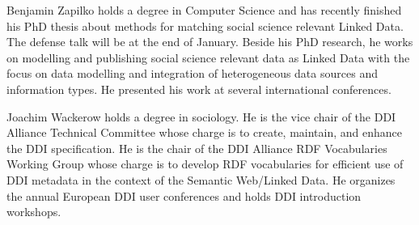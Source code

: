 \documentclass{llncs}
\begin{document}
Benjamin Zapilko holds a degree in Computer Science and has recently finished his PhD thesis about methods for matching social science relevant Linked Data. The defense talk will be at the end of January. Beside his PhD research, he works on modelling and publishing social science relevant data as Linked Data with the focus on data modelling and integration of heterogeneous data sources and information types. He presented his work at several international conferences.

Joachim Wackerow holds a degree in sociology. 
He is the vice chair of the DDI Alliance Technical Committee whose charge is to create, maintain, and enhance the DDI specification.
He is the chair of the DDI Alliance RDF Vocabularies Working Group whose charge is to develop RDF vocabularies for efficient use of DDI metadata in the context of the Semantic Web/Linked Data.
He organizes the annual European DDI user conferences and holds DDI introduction workshops.

{}

\setcounter{tocdepth}{1}
\end{document}
